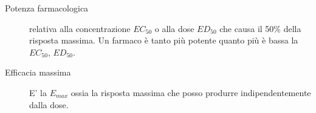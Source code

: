 \begin{description}
\item[Potenza farmacologica] relativa alla concentrazione $EC_{50}$ o alla dose $ED_{50}$ che causa il 50\% della risposta massima. Un farmaco è tanto più potente quanto più è bassa la $EC_{50}$, $ED_{50}$.

\item[Efficacia massima] E' la $E_{max}$ ossia la risposta massima che posso produrre indipendentemente dalla dose.
\end{description}







